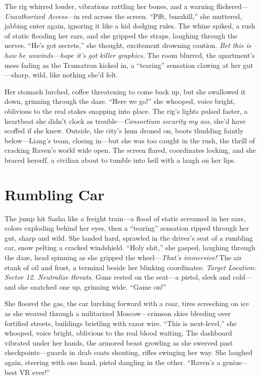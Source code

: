 \documentclass[12pt]{book}
\begin{document}
The rig whirred louder, vibrations rattling her bones, and a warning flickered—\textit{Unauthorized Access}—in red across the screen. “Pfft, buzzkill,” she muttered, jabbing enter again, ignoring it like a kid dodging rules. The whine spiked, a rush of static flooding her ears, and she gripped the straps, laughing through the nerves. “He’s got secrets,” she thought, excitement drowning caution. \textit{Bet this is how he unwinds—hope it’s got killer graphics.} The room blurred, the apartment’s mess fading as the Transatron kicked in, a “tearing” sensation clawing at her gut—sharp, wild, like nothing she’d felt.

Her stomach lurched, coffee threatening to come back up, but she swallowed it down, grinning through the daze. “Here we go!” she whooped, voice bright, oblivious to the real stakes snapping into place. The rig’s lights pulsed faster, a heartbeat she didn’t clock as trouble—\textit{Consortium security my ass,} she’d have scoffed if she knew. Outside, the city’s hum droned on, boots thudding faintly below—Liang’s team, closing in—but she was too caught in the rush, the thrill of cracking Raven’s world wide open. The screen flared, coordinates locking, and she braced herself, a civilian about to tumble into hell with a laugh on her lips.

\section{Rumbling Car}

The jump hit Sasha like a freight train—a flood of static screamed in her ears, colors exploding behind her eyes, then a “tearing” sensation ripped through her gut, sharp and wild. She landed hard, sprawled in the driver’s seat of a rumbling car, snow pelting a cracked windshield. “Holy shit,” she gasped, laughing through the daze, head spinning as she gripped the wheel—\textit{That’s immersive!} The air stank of oil and frost, a terminal beside her blinking coordinates: \textit{Target Location: Sector 12. Neutralize threats.} Guns rested on the seat—a pistol, sleek and cold—and she snatched one up, grinning wide. “Game on!”

She floored the gas, the car lurching forward with a roar, tires screeching on ice as she weaved through a militarized Moscow—crimson skies bleeding over fortified streets, buildings bristling with razor wire. “This is next-level,” she whooped, voice bright, oblivious to the real blood waiting. The dashboard vibrated under her hands, the armored beast growling as she swerved past checkpoints—guards in drab coats shouting, rifles swinging her way. She laughed again, steering with one hand, pistol dangling in the other. “Raven’s a genius—best VR ever!”
\end{document}
